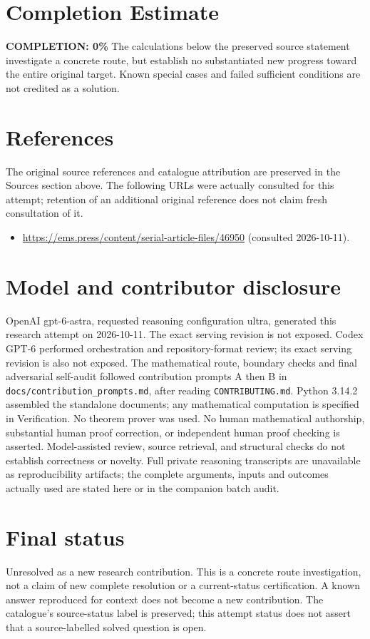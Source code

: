 \documentclass[11pt]{article}
\begin{document}
\section{Completion Estimate}
\noindent\textbf{COMPLETION: 0\%}
The calculations below the preserved source statement investigate a concrete route,
but establish no substantiated new progress toward the entire original target.
Known special cases and failed sufficient conditions are not credited as a solution.
\section{References}
The original source references and catalogue attribution are preserved in the
Sources section above. The following URLs were actually consulted for this attempt;
retention of an additional original reference does not claim fresh consultation of it.
\begin{itemize}
\item \url{https://ems.press/content/serial-article-files/46950} (consulted 2026-10-11). 
\end{itemize}
\section{Model and contributor disclosure}
OpenAI gpt-6-astra, requested reasoning configuration ultra, generated this research
attempt on 2026-10-11. The exact serving revision is not exposed. Codex GPT-6
performed orchestration and repository-format review; its exact serving revision
is also not exposed. The mathematical route, boundary checks and final adversarial
self-audit followed contribution prompts A then B in
\texttt{docs/contribution\_prompts.md}, after reading \texttt{CONTRIBUTING.md}.
Python 3.14.2 assembled the standalone documents; any mathematical computation is
specified in Verification. No theorem prover was used. No human mathematical
authorship, substantial human proof correction, or independent human proof checking
is asserted. Model-assisted review, source retrieval, and structural checks do not
establish correctness or novelty. Full private reasoning transcripts are unavailable
as reproducibility artifacts; the complete arguments, inputs and outcomes actually
used are stated here or in the companion batch audit.
\section{Final status}
Unresolved as a new research contribution. This is a concrete route investigation,
not a claim of new complete resolution or a current-status certification. A known
answer reproduced for context does not become a new contribution. The catalogue's
source-status label is preserved; this attempt status does not assert that a
source-labelled solved question is open.
\end{document}
